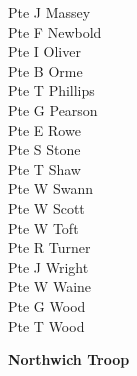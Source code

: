 \begin{multicols}{3}
  Pte J Massey \\
  Pte F Newbold \\
  Pte I Oliver \\
  Pte B Orme \\
  Pte T Phillips \\
  Pte G Pearson \\
  Pte E Rowe \\
  Pte S Stone \\
  Pte T Shaw \\
  Pte W Swann \\
  Pte W Scott \\
  Pte W Toft \\
  Pte R Turner \\
  Pte J Wright \\
  Pte W Waine \\
  Pte G Wood \\
  Pte T Wood \\
\end{multicols}

\vspace*{10mm}

\begin{center}
  \Large
  \textbf{Northwich Troop}
\end{center}

\vspace*{10mm}

